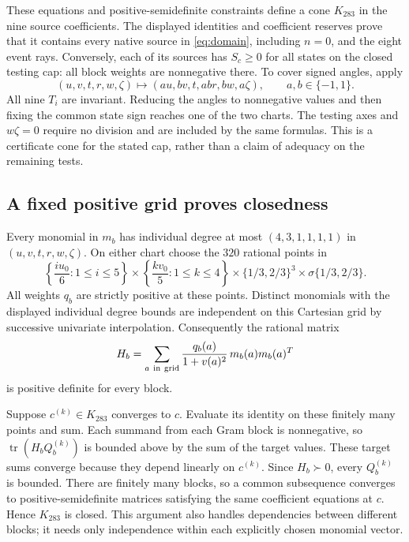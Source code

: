 These equations and positive-semidefinite constraints define a cone
$K_{283}$ in the nine source coefficients. The displayed identities
and coefficient reserves prove that it contains every native source
in \eqref{eq:domain}, including $n=0$, and the eight event rays.
Conversely, each of its sources has $S_c\geq0$ for all states on the
closed testing cap: all block weights are nonnegative there.
To cover signed angles, apply
\[
 (u,v,t,r,w,\zeta)\longmapsto
 (a u,b v,t,ab r,bw,a\zeta),\qquad a,b\in\{-1,1\}.
\]
All nine $T_i$ are invariant. Reducing the angles to nonnegative
values and then fixing the common state sign reaches one of the two
charts. The testing axes and $w\zeta=0$ require no division and are
included by the same formulas. This is a certificate cone for the
stated cap, rather than a claim of adequacy on the remaining tests.

\subsection*{A fixed positive grid proves closedness}
Every monomial in $m_b$ has individual degree at most
$(4,3,1,1,1,1)$ in $(u,v,t,r,w,\zeta)$.
On either chart choose the $320$ rational points in
\[
 \left\{\frac{i u_0}{6}:1\leq i\leq5\right\}
 \times\left\{\frac{k v_0}{5}:1\leq k\leq4\right\}
 \times\{1/3,2/3\}^{3}\times\sigma\{1/3,2/3\}.
\]
All weights $q_b$ are strictly positive at these points. Distinct
monomials with the displayed individual degree bounds are independent
on this Cartesian grid by successive univariate interpolation.
Consequently the rational matrix
\[
       H_b=\sum_{a\ \rm in\ grid}
              \frac{q_b(a)}{1+v(a)^2}\,m_b(a)m_b(a)^T
\]
is positive definite for every block.

Suppose $c^{(k)}\in K_{283}$ converges to $c$. Evaluate its identity
on these finitely many points and sum. Each summand from each Gram
block is nonnegative, so $\operatorname{tr}(H_bQ_b^{(k)})$ is bounded
above by the sum of the target values. These target sums converge
because they depend linearly on $c^{(k)}$. Since $H_b\succ0$, every
$Q_b^{(k)}$ is bounded. There are finitely many blocks, so a common
subsequence converges to positive-semidefinite matrices satisfying
the same coefficient equations at $c$. Hence $K_{283}$ is closed.
This argument also handles dependencies between different blocks;
it needs only independence within each explicitly chosen monomial vector.

